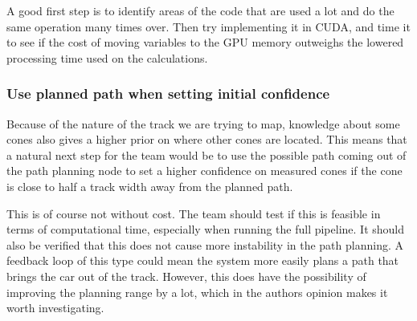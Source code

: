 A good first step is to identify areas of the code that are used a lot and do the same operation many times over. Then try implementing it in CUDA, and time it to see if the cost of moving variables to the GPU memory outweighs the lowered processing time used on the calculations. 

\subsubsection{Use planned path when setting initial confidence}
Because of the nature of the track we are trying to map, knowledge about some cones also gives a higher prior on where other cones are located. This means that a natural next step for the team would be to use the possible path coming out of the path planning node to set a higher confidence on measured cones if the cone is close to half a track width away from the planned path. 

This is of course not without cost. The team should test if this is feasible in terms of computational time, especially when running the full pipeline. It should also be verified that this does not cause more instability in the path planning. A feedback loop of this type could mean the system more easily plans a path that brings the car out of the track. However, this does have the possibility of improving the planning range by a lot, which in the authors opinion makes it worth investigating.